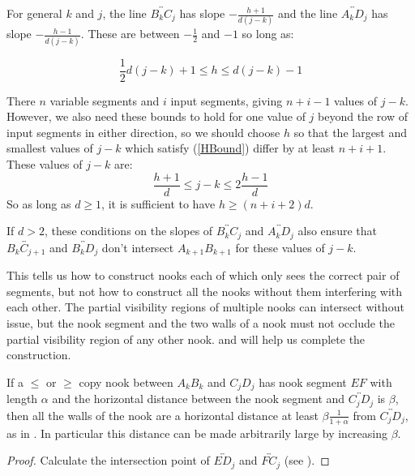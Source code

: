 For general $k$ and $j$, the line $\overleftrightarrow{B_kC_j}$ has slope $-\frac{h+1}{d(j-k)}$ and the line $\overleftrightarrow{A_kD_j}$ has slope $-\frac{h-1}{d(j-k)}$. These are between $-\frac12$ and $-1$ so long as:

\begin{equation}
\label{HBound}
\frac12d(j-k)+1\le h\le d(j-k)-1
\end{equation}

There $n$ variable segments and $i$ input segments, giving $n+i-1$ values of $j-k$. However, we also need these bounds to hold for one value of $j$ beyond the row of input segments in either direction, so we should choose $h$ so that the largest and smallest values of $j-k$ which satisfy (\ref{HBound}) differ by at least $n+i+1$. These values of $j-k$ are:
\begin{equation}
\label{JKRange}
\frac{h+1}{d}\le j-k\le 2\frac{h-1}{d}
\end{equation}
So as long as $d\ge 1$, it is sufficient to have $h\ge (n+i+2)d$. 

If $d>2$, these conditions on the slopes of $\overleftrightarrow{B_kC_j}$ and $\overleftrightarrow{A_kD_j}$ also ensure that $\overleftrightarrow{B_kC_{j+1}}$ and $\overleftrightarrow{B_kD_j}$ don't intersect $A_{k+1}B_{k+1}$ for these values of $j-k$.

This tells us how to construct nooks each of which only sees the correct pair of segments, but not how to construct all the nooks without them interfering with each other. The partial visibility regions of multiple nooks can intersect without issue, but the nook segment and the two walls of a nook must not occlude the partial visibility region of any other nook.  and  will help us complete the construction.

\begin{lemma}\label{lem:NookWall}
If a $\le$ or $\ge$ copy nook between $A_kB_k$ and $C_jD_j$ has nook segment $EF$ with length $\alpha$ and the horizontal distance between the nook segment and $\overleftrightarrow{C_jD_j}$ is $\beta$, then all the walls of the nook are a horizontal distance at least $\beta\frac{1}{1+\alpha}$ from $\overleftrightarrow{C_jD_j}$, as in . In particular this distance can be made arbitrarily large by increasing $\beta$.
\end{lemma}

\begin{proof}
Calculate the intersection point of $\overleftrightarrow{ED_j}$ and $\overleftrightarrow{FC_j}$ (see ).
\end{proof}

